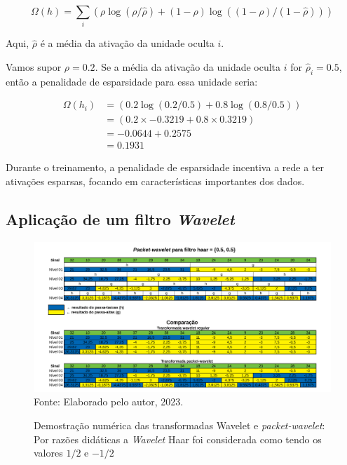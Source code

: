 \begin{apendicesenv}
		\begin{equation}
			\Omega(h) = \sum_i (\rho \log(\rho / \hat{\rho}) + (1 - \rho) \log((1 - \rho) / (1 - \hat{\rho})))
		\end{equation}
		
		
		\par Aqui, $ \hat{\rho} $ é a média da ativação da unidade oculta $ i $.

		\par  Vamos supor $ \rho = 0.2 $. Se a média da ativação da unidade oculta $ i $ for $ \hat{\rho}_i = 0.5 $, então a penalidade de esparsidade para essa unidade seria:
		
		\begin{equation}
			\begin{aligned}
				\Omega(h_i) &= (0.2 \log(0.2 / 0.5) + 0.8 \log(0.8 / 0.5)) \\
							&= (0.2 \times -0.3219 + 0.8 \times 0.3219) \\
							&= -0.0644 + 0.2575 \\
							&= 0.1931 
			\end{aligned}
		\end{equation}
		\par Durante o treinamento, a penalidade de esparsidade incentiva a rede a ter ativações esparsas, focando em características importantes dos dados.


	\begin{landscape}
		\chapter{Aplicação de um filtro \textit{Wavelet}}
		\label{sec:aplicaWavelet}
		\begin{figure}[H]
			\centering
			\caption[Demostração numérica das transformadas Wavelet]{Demostração numérica das transformadas Wavelet e \textit{packet-wavelet}: Por razões didáticas a \textit{Wavelet} Haar foi considerada como tendo os valores $1/2$ e $-1/2$}
			\includegraphics[width=.85\linewidth]{images/haarWaveletExamples.pdf}
			\label{fig:haarWaveletExamples}
			\\Fonte: Elaborado pelo autor, 2023. 
		\end{figure}
	\end{landscape}

\end{apendicesenv}









